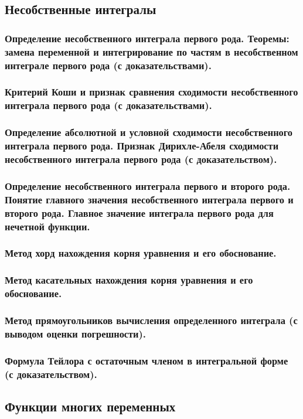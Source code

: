 \documentclass[10pt]{article}
\begin{document}
    \subsection{Несобственные интегралы}
    \subsubsection{Определение несобственного интеграла первого рода. Теоремы: замена переменной и интегрирование по частям в несобственном интеграле первого рода (с доказательствами).}
    \subsubsection{Критерий Коши и признак сравнения сходимости несобственного интеграла первого рода (с доказательствами).}
    \subsubsection{Определение абсолютной и условной сходимости несобственного интеграла первого рода. Признак Дирихле-Абеля сходимости несобственного интеграла первого рода (с доказательством).}
    \subsubsection{Определение несобственного интеграла первого и второго рода. Понятие главного значения несобственного интеграла первого и второго рода. Главное значение интеграла первого рода для нечетной функции.}
    \subsubsection{Метод хорд нахождения корня уравнения и его обоснование.}
    \subsubsection{Метод касательных нахождения корня уравнения и его обоснование.}
    \subsubsection{Метод прямоугольников вычисления определенного интеграла (с выводом оценки погрешности).}
    \subsubsection{Формула Тейлора с остаточным членом в интегральной форме (с доказательством).}
    \subsection{Функции многих переменных}
\end{document}
